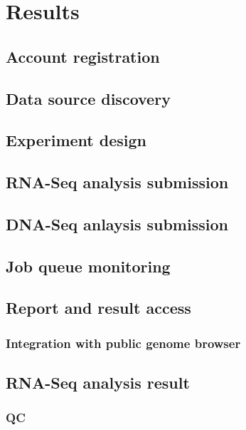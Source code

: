 \chapter{Results}
\label{c:result}

\section{Account registration}


\section{Data source discovery}


\section{Experiment design}


\section{RNA-Seq analysis submission}

\section{DNA-Seq anlaysis submission}

\section{Job queue monitoring}


\section{Report and result access}

\subsection{Integration with public genome browser}


\section{RNA-Seq analysis result}

\subsection{QC}

